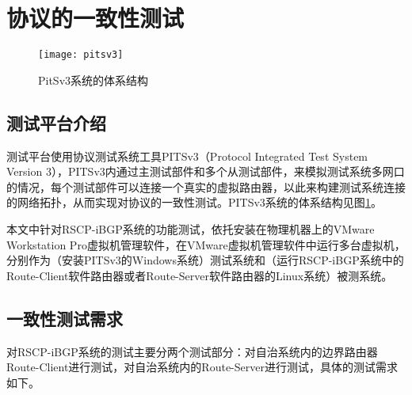 \section{协议的一致性测试}

\begin{figure}
  \centering
  \texttt{[image: pitsv3]}
  \caption{PitSv3系统的体系结构\cite{journals_chinaf_YinWJS08}}
  \label{fig:pitsv3}
\end{figure}

\subsection{测试平台介绍}
测试平台使用协议测试系统工具PITSv3\cite{journals_chinaf_YinWJS08}（Protocol Integrated Test System Version 3），PITSv3内通过主测试部件和多个从测试部件，来模拟测试系统多网口的情况，每个测试部件可以连接一个真实的虚拟路由器，以此来构建测试系统连接的网络拓扑，从而实现对协议的一致性测试。PITSv3系统的体系结构见图\ref{fig:pitsv3}。

本文中针对RSCP-iBGP系统的功能测试，依托安装在物理机器上的VMware Workstation Pro虚拟机管理软件，在VMware虚拟机管理软件中运行多台虚拟机，分别作为（安装PITSv3的Windows系统）测试系统和（运行RSCP-iBGP系统中的Route-Client软件路由器或者Route-Server软件路由器的Linux系统）被测系统\cite{pitsv3}。

\subsection{一致性测试需求}

对RSCP-iBGP系统的测试主要分两个测试部分：对自治系统内的边界路由器Route-Client进行测试，对自治系统内的Route-Server进行测试，具体的测试需求如下。

